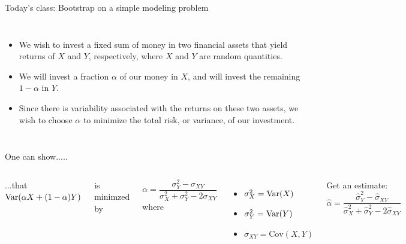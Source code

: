 \documentclass[aspectratio=169,usenames,dvipsnames]{beamer}
\newcommand{\InstructorNotes}[1]{\textit{\color{orange}#1}}
\renewcommand{\InstructorNotes}[1]{}
\begin{document}
\begin{frame}[c]{Today's class: Bootstrap on a simple modeling problem}

\begin{columns}
\centering
\begin{itemize}
	\item
We wish to invest a fixed sum of money in two financial assets that yield returns of $X$ and $Y$, respectively, where $X$ and $Y$ are random quantities.
\item We will invest a fraction $\alpha$ of our money in $X$, and will
invest the remaining $1-\alpha$ in $Y$.
\item  Since there is variability associated with the returns on these two assets, we wish to choose $\alpha$ to minimize the total risk, or variance, of our investment.
\end{itemize}

\centering
\InstructorNotes{
Really: want to minimize $\Var(\alpha X + (1-\alpha)Y)$
}
\end{columns}

\end{frame}
\begin{frame}[c]{One can show.....}

\begin{columns}
\centering
...that
$\Var(\alpha X + (1-\alpha)Y)$

is minimzed by

\begin{equation*}
	\alpha = \frac{\sigma_Y^2 - \sigma_{XY}}{\sigma_X^2 + \sigma_Y^2 - 2\sigma_{XY}}
\end{equation*}
where
\begin{itemize}
	\item $\sigma_X^2 = \mathrm{Var}(X)$
	\item $\sigma_Y^2= \mathrm{Var}(Y)$
	\item $\sigma_{XY} = \mathrm{Cov}(X,Y)$
\end{itemize}
\centering
Get an estimate:
\begin{equation*}
	\hat\alpha = \frac{\hat\sigma_Y^2 - \hat\sigma_{XY}}{\hat\sigma_X^2 + \hat\sigma_Y^2 - 2\hat\sigma_{XY}}
\end{equation*}
\end{columns}

\end{frame}
\end{document}
